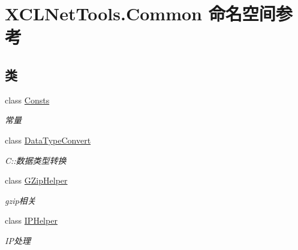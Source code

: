 \hypertarget{namespace_x_c_l_net_tools_1_1_common}{}\section{X\+C\+L\+Net\+Tools.\+Common 命名空间参考}
\label{namespace_x_c_l_net_tools_1_1_common}
\subsection*{类}
\begin{DoxyCompactItemize}
\item 
class \hyperlink{class_x_c_l_net_tools_1_1_common_1_1_consts}{Consts}
\begin{DoxyCompactList}\small\item\em 常量 \end{DoxyCompactList}\item 
class \hyperlink{class_x_c_l_net_tools_1_1_common_1_1_data_type_convert}{Data\+Type\+Convert}
\begin{DoxyCompactList}\small\item\em C\+::数据类型转换 \end{DoxyCompactList}\item 
class \hyperlink{class_x_c_l_net_tools_1_1_common_1_1_g_zip_helper}{G\+Zip\+Helper}
\begin{DoxyCompactList}\small\item\em gzip相关 \end{DoxyCompactList}\item 
class \hyperlink{class_x_c_l_net_tools_1_1_common_1_1_i_p_helper}{I\+P\+Helper}
\begin{DoxyCompactList}\small\item\em I\+P处理 \end{DoxyCompactList}\end{DoxyCompactItemize}
